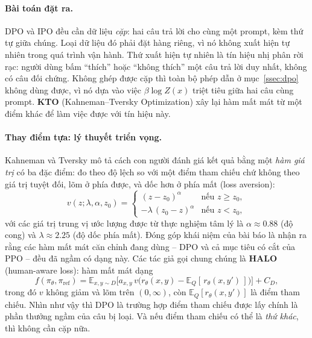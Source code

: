 \paragraph{Bài toán đặt ra.} DPO và IPO đều cần dữ liệu \emph{cặp}: hai câu trả lời cho cùng một prompt, kèm thứ tự giữa chúng. Loại dữ liệu đó phải đặt hàng riêng, vì nó không xuất hiện tự nhiên trong quá trình vận hành. Thứ xuất hiện tự nhiên là tín hiệu nhị phân rời rạc: người dùng bấm ``thích'' hoặc ``không thích'' một câu trả lời duy nhất, không có câu đối chứng. Không ghép được cặp thì toàn bộ phép dẫn ở mục~\ref{ssec:dpo} không dùng được, vì nó dựa vào việc \( \beta\log Z(x) \) triệt tiêu giữa hai câu cùng prompt. \textbf{KTO} (Kahneman--Tversky Optimization) \cite{ethayarajh2024kto} xây lại hàm mất mát từ một điểm khác để làm việc được với tín hiệu này.

\paragraph{Thay điểm tựa: lý thuyết triển vọng.} Kahneman và Tversky mô tả cách con người đánh giá kết quả bằng một \emph{hàm giá trị} có ba đặc điểm: đo theo độ lệch so với một điểm tham chiếu chứ không theo giá trị tuyệt đối, lõm ở phía được, và dốc hơn ở phía mất (loss aversion):
\[
    v(z; \lambda, \alpha, z_0) =
    \begin{cases}
        (z - z_0)^{\alpha} & \text{nếu } z \geq z_0, \\
        -\lambda\,(z_0 - z)^{\alpha} & \text{nếu } z < z_0,
    \end{cases}
\]
với các giá trị trung vị ước lượng được từ thực nghiệm tâm lý là \( \alpha \approx 0.88 \) (độ cong) và \( \lambda \approx 2.25 \) (độ dốc phía mất). Đóng góp khái niệm của bài báo là nhận ra rằng các hàm mất mát căn chỉnh đang dùng -- DPO và cả mục tiêu có cắt của PPO -- đều đã ngầm có dạng này. Các tác giả gọi chung chúng là \textbf{HALO} (human-aware loss): hàm mất mát dạng
\[
    f(\pi_{\theta}, \pi_{\text{ref}})
    = \mathbb{E}_{x,y \sim D}\Big[ a_{x,y}\, v\big( r_{\theta}(x,y) - \mathbb{E}_{Q}[\,r_{\theta}(x,y')\,] \big) \Big] + C_{D},
\]
trong đó \( v \) không giảm và lõm trên \( (0, \infty) \), còn \( \mathbb{E}_{Q}[r_{\theta}(x,y')] \) là điểm tham chiếu. Nhìn như vậy thì DPO là trường hợp điểm tham chiếu được lấy chính là phần thưởng ngầm của câu bị loại. Và nếu điểm tham chiếu có thể là \emph{thứ khác}, thì không cần cặp nữa.

